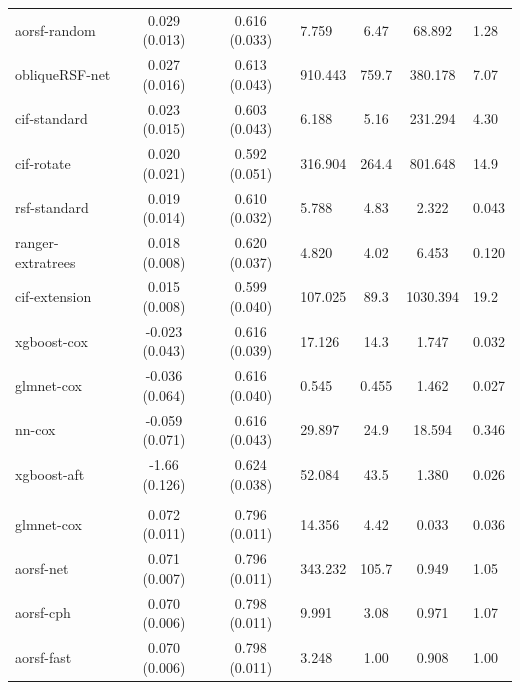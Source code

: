 \documentclass[twoside,11pt]{article}\usepackage[]{graphicx}\usepackage[]{xcolor}
\newenvironment{knitrout}{}{} %
\begin{document}
\begin{knitrout}
\begin{longtable}{lcclccl}
\hspace{1em}aorsf-random & 0.029 (0.013) & 0.616 (0.033) & 7.759 & 6.47 & 68.892 & 1.28\\
\hspace{1em}obliqueRSF-net & 0.027 (0.016) & 0.613 (0.043) & 910.443 & 759.7 & 380.178 & 7.07\\
\hspace{1em}cif-standard & 0.023 (0.015) & 0.603 (0.043) & 6.188 & 5.16 & 231.294 & 4.30\\
\hspace{1em}cif-rotate & 0.020 (0.021) & 0.592 (0.051) & 316.904 & 264.4 & 801.648 & 14.9\\
\hspace{1em}rsf-standard & 0.019 (0.014) & 0.610 (0.032) & 5.788 & 4.83 & 2.322 & 0.043\\
\hspace{1em}ranger-extratrees & 0.018 (0.008) & 0.620 (0.037) & 4.820 & 4.02 & 6.453 & 0.120\\
\hspace{1em}cif-extension & 0.015 (0.008) & 0.599 (0.040) & 107.025 & 89.3 & 1030.394 & 19.2\\
\hspace{1em}xgboost-cox & -0.023 (0.043) & 0.616 (0.039) & 17.126 & 14.3 & 1.747 & 0.032\\
\hspace{1em}glmnet-cox & -0.036 (0.064) & 0.616 (0.040) & 0.545 & 0.455 & 1.462 & 0.027\\
\hspace{1em}nn-cox & -0.059 (0.071) & 0.616 (0.043) & 29.897 & 24.9 & 18.594 & 0.346\\
\hspace{1em}xgboost-aft & -1.66 (0.126) & 0.624 (0.038) & 52.084 & 43.5 & 1.380 & 0.026\\
\addlinespace[0.3em]
\hline
\multicolumn{7}{l}{\textit{\textbf{SPRINT; CVD death, n = 9361, p = 174}}}\\
\hline
\hspace{1em}glmnet-cox & 0.072 (0.011) & 0.796 (0.011) & 14.356 & 4.42 & 0.033 & 0.036\\
\hspace{1em}aorsf-net & 0.071 (0.007) & 0.796 (0.011) & 343.232 & 105.7 & 0.949 & 1.05\\
\hspace{1em}aorsf-cph & 0.070 (0.006) & 0.798 (0.011) & 9.991 & 3.08 & 0.971 & 1.07\\
\hspace{1em}aorsf-fast & 0.070 (0.006) & 0.798 (0.011) & 3.248 & 1.00 & 0.908 & 1.00\\

\end{longtable}
\end{knitrout}
\end{document}
